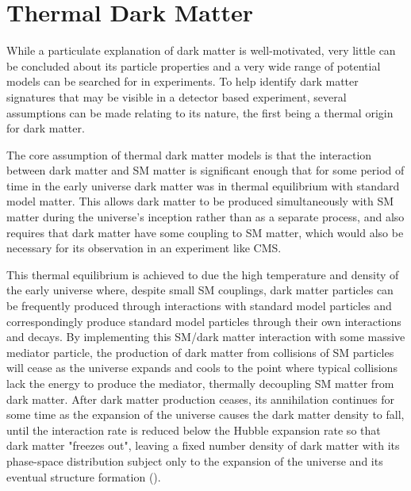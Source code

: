 \section{Thermal Dark Matter}
While a particulate explanation of dark matter is well-motivated, very little can be concluded about its particle properties and a very wide range of potential models can be searched for in experiments.
To help identify dark matter signatures that may be visible in a detector based experiment, several assumptions can be made relating to its nature, the first being a thermal origin for dark matter.

The core assumption of thermal dark matter models is that the interaction between dark matter and SM matter is significant enough that for some period of time in the early universe dark matter was in thermal equilibrium with standard model matter.
This allows dark matter to be produced simultaneously with SM matter during the universe's inception rather than as a separate process, and also requires that dark matter have some coupling to SM matter, which would also be necessary for its observation in an experiment like CMS.

This thermal equilibrium is achieved to due the high temperature and density of the early universe where, despite small SM couplings, dark matter particles can be frequently produced through interactions with standard model particles and correspondingly produce standard model particles through their own interactions and decays.
By implementing this SM/dark matter interaction with some massive mediator particle, the production of dark matter from collisions of SM particles will cease as the universe expands and cools to the point where typical collisions lack the energy to produce the mediator, thermally decoupling SM matter from dark matter.
After dark matter production ceases, its annihilation continues for some time as the expansion of the universe causes the dark matter density to fall, until the interaction rate is reduced below the Hubble expansion rate so that dark matter "freezes out", leaving a fixed number density of dark matter with its phase-space distribution subject only to the expansion of the universe and its eventual structure formation \cite{thermalDM} ().


